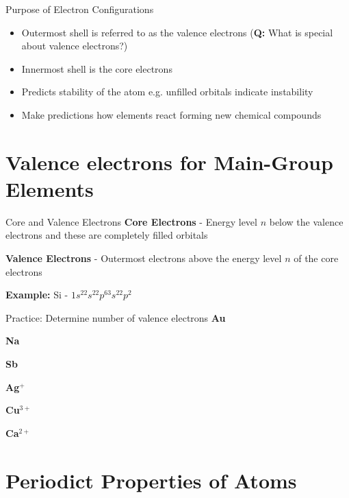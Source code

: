 \documentclass[11pt]{beamer}
\begin{document}
\begin{frame}{Purpose of Electron Configurations}
  \begin{itemize}
  \item Outermost shell is referred to as the valence
    electrons (\textbf{Q:} What is special about valence electrons?)
  \item Innermost shell is the core electrons
  \item Predicts stability of the atom e.g. unfilled orbitals
    indicate instability
  \item Make predictions how elements react forming new chemical
    compounds
  \end{itemize}
\end{frame}

\section{Valence electrons for Main-Group Elements}

\begin{frame}{Core and Valence Electrons}
  \textbf{Core Electrons} - Energy level $n$ below the valence
  electrons and these are completely filled orbitals

  \textbf{Valence Electrons} - Outermost electrons above the energy
  level $n$ of the core electrons

  \textbf{Example:} Si - $1s^22s^22p^63s^22p^2$
\end{frame}

\begin{frame}{Practice: Determine number of valence electrons}
  \textbf{Au}
  \vspace{0.25in}

  \textbf{Na}
  \vspace{0.25in}
  
  \textbf{Sb}
  \vspace{0.25in}
  
  \textbf{Ag$^+$}
  \vspace{0.25in}

  \textbf{Cu$^{3+}$}
  \vspace{0.25in}

  \textbf{Ca$^{2+}$}
  \vspace{0.25in}
  
\end{frame}

\section{Periodict Properties of Atoms}
\end{document}
